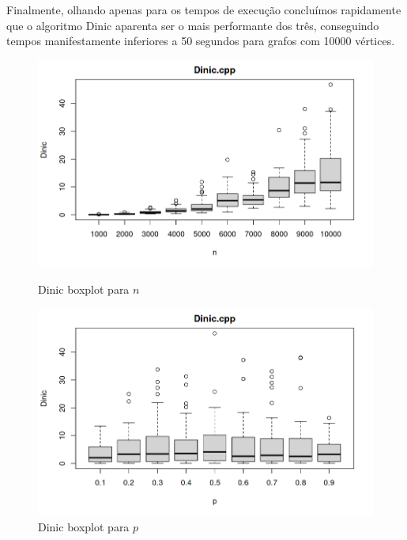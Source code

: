 \documentclass{uofa-eng-assignment}
\begin{document}
Finalmente, olhando apenas para os tempos de execução concluímos rapidamente que o algoritmo Dinic aparenta ser o mais performante dos três, conseguindo tempos manifestamente inferiores a 50 segundos para grafos com 10000 vértices.

\begin{figure}[h]
    \begin{minipage}{0.45\textwidth}
        \centering
        \includegraphics[width=1\textwidth]{boxplot_dinic_n.png}
        \caption{Dinic boxplot para $n$}
        \label{fig:boxplot-dinic-n}
    \end{minipage}
    \hfill
    \begin{minipage}{0.45\textwidth}
        \centering
        \includegraphics[width=1\textwidth]{boxplot_dinic_p.png}
        \caption{Dinic boxplot para $p$}
        \label{fig:boxplot-dinic-p}
    \end{minipage}
\end{figure}
\end{document}
